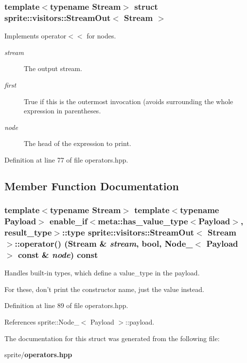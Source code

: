 \subsubsection*{template$<$typename Stream$>$ struct sprite::visitors::Stream\-Out$<$ Stream $>$}

Implements operator$<$$<$ for nodes. 

\begin{Desc}
\item[Parameters:]
\begin{description}
\item[{\em stream}]The output stream. \item[{\em first}]True if this is the outermost invocation (avoids surrounding the whole expression in parentheses. \item[{\em node}]The head of the expression to print. \end{description}
\end{Desc}




Definition at line 77 of file operators.hpp.

\subsection{Member Function Documentation}
\subsubsection{\setlength{\rightskip}{0pt plus 5cm}template$<$typename Stream$>$ template$<$typename Payload$>$ enable\_\-if$<$meta::has\_\-value\_\-type$<$Payload$>$, result\_\-type$>$::type {\bf sprite::visitors::Stream\-Out}$<$ Stream $>$::operator() (Stream \& {\em stream}, bool, {\bf Node\_\-}$<$ Payload $>$ const \& {\em node}) const\hspace{0.3cm}{\tt  [inline]}}\label{structsprite_1_1visitors_1_1StreamOut_a1}


Handles built-in types, which define a value\_\-type in the payload. 

For these, don't print the constructor name, just the value instead. 

Definition at line 89 of file operators.hpp.

References sprite::Node\_\-$<$ Payload $>$::payload.

The documentation for this struct was generated from the following file:\begin{CompactItemize}
\item 
sprite/{\bf operators.hpp}\end{CompactItemize}
